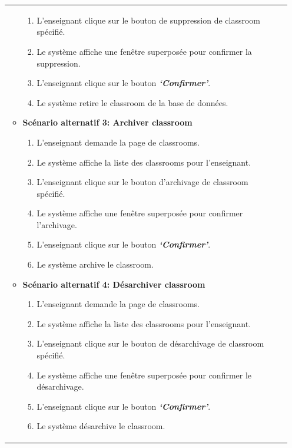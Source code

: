 \begin{itemize}[itemsep=1pt, parsep=1pt]
\begin{longtable}{|>{\RaggedRight\arraybackslash}p{4cm}|>{\RaggedRight\arraybackslash}p{12cm}|}
\begin{itemize}[label=]
\begin{enumerate}
                \item L’enseignant clique sur le bouton de suppression de classroom spécifié.
                \item Le système affiche une fenêtre superposée pour confirmer la suppression. 
                \item L’enseignant clique sur le bouton \textbf{\textit{‘Confirmer’}}.
                \item Le système retire le classroom de la base de données.
            \end{enumerate}
            \item \textbf{Scénario alternatif 3: Archiver classroom }
            \begin{enumerate}
                \item L’enseignant demande la page de classrooms.
                \item Le système affiche la liste des classrooms pour l’enseignant. 
                \item L’enseignant clique sur le bouton d’archivage de classroom spécifié.
                \item Le système affiche une fenêtre superposée pour confirmer l’archivage. 
                \item L’enseignant clique sur le bouton \textbf{\textit{‘Confirmer’}}.
                \item Le système archive le classroom.
            \end{enumerate}
            \item \textbf{Scénario alternatif 4: Désarchiver classroom }
            \begin{enumerate}
                \item L’enseignant demande la page de classrooms.
                \item Le système affiche la liste des classrooms pour l’enseignant. 
                \item L’enseignant clique sur le bouton de désarchivage de classroom spécifié.
                \item Le système affiche une fenêtre superposée pour confirmer le désarchivage.
                \item L’enseignant clique sur le bouton \textbf{\textit{‘Confirmer’}}.
                \item Le système désarchive le classroom.
            \end{enumerate}



\end{itemize}
\end{longtable}
\end{itemize}
